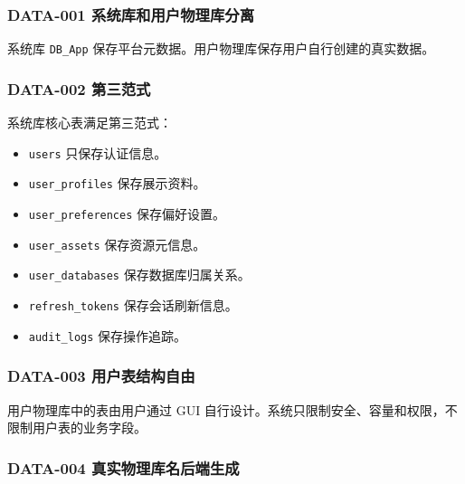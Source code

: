 \documentclass[
  a4paper,
  UTF8]{ctexart}
\providecommand{\tightlist}{%
  \setlength{\itemsep}{0pt}\setlength{\parskip}{0pt}}
\begin{document}
\hypertarget{data-001-ux7cfbux7edfux5e93ux548cux7528ux6237ux7269ux7406ux5e93ux5206ux79bb}{%
\subsubsection{DATA-001
系统库和用户物理库分离}\label{data-001-ux7cfbux7edfux5e93ux548cux7528ux6237ux7269ux7406ux5e93ux5206ux79bb}}

系统库 \texttt{DB\_App}
保存平台元数据。用户物理库保存用户自行创建的真实数据。

\hypertarget{data-002-ux7b2cux4e09ux8303ux5f0f}{%
\subsubsection{DATA-002
第三范式}\label{data-002-ux7b2cux4e09ux8303ux5f0f}}

系统库核心表满足第三范式：

\begin{itemize}
\tightlist
\item
  \texttt{users} 只保存认证信息。
\item
  \texttt{user\_profiles} 保存展示资料。
\item
  \texttt{user\_preferences} 保存偏好设置。
\item
  \texttt{user\_assets} 保存资源元信息。
\item
  \texttt{user\_databases} 保存数据库归属关系。
\item
  \texttt{refresh\_tokens} 保存会话刷新信息。
\item
  \texttt{audit\_logs} 保存操作追踪。
\end{itemize}

\hypertarget{data-003-ux7528ux6237ux8868ux7ed3ux6784ux81eaux7531}{%
\subsubsection{DATA-003
用户表结构自由}\label{data-003-ux7528ux6237ux8868ux7ed3ux6784ux81eaux7531}}

用户物理库中的表由用户通过 GUI
自行设计。系统只限制安全、容量和权限，不限制用户表的业务字段。

\hypertarget{data-004-ux771fux5b9eux7269ux7406ux5e93ux540dux540eux7aefux751fux6210}{%
\subsubsection{DATA-004
真实物理库名后端生成}\label{data-004-ux771fux5b9eux7269ux7406ux5e93ux540dux540eux7aefux751fux6210}}
\end{document}
